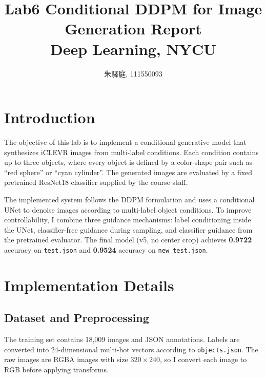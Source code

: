 \documentclass[10pt,twocolumn,letterpaper]{article}
\title{\LARGE Lab6 Conditional DDPM for Image Generation Report\\[0.5em]
\large Deep Learning, NYCU}
\author{朱驛庭, 111550093}
\date{}
\begin{document}
\maketitle

\section{Introduction}

The objective of this lab is to implement a conditional generative model that synthesizes iCLEVR images from multi-label conditions. Each condition contains up to three objects, where every object is defined by a color-shape pair such as ``red sphere'' or ``cyan cylinder''. The generated images are evaluated by a fixed pretrained ResNet18 classifier supplied by the course staff.

The implemented system follows the DDPM formulation and uses a conditional UNet to denoise images according to multi-label object conditions. To improve controllability, I combine three guidance mechanisms: label conditioning inside the UNet, classifier-free guidance during sampling, and classifier guidance from the pretrained evaluator. The final model (v5, no center crop) achieves \textbf{0.9722} accuracy on \texttt{test.json} and \textbf{0.9524} accuracy on \texttt{new\_test.json}.

\section{Implementation Details}

\subsection{Dataset and Preprocessing}

The training set contains 18,009 images and JSON annotations. Labels are converted into 24-dimensional multi-hot vectors according to \texttt{objects.json}. The raw images are RGBA images with size $320\times240$, so I convert each image to RGB before applying transforms.
\end{document}
